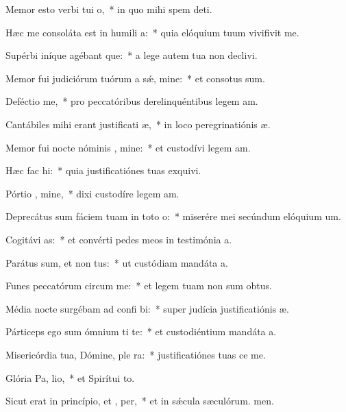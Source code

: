\item Memor esto verbi tui  o,~* in quo mihi spem deti.
\item Hæc me consoláta est in humili a:~* quia elóquium tuum vivifivit me.
\item Supérbi iníque agébant que:~* a lege autem tua non declivi.
\item Memor fui judiciórum tuórum a sǽ, mine:~* et consotus sum.
\item Deféctio  me,~* pro peccatóribus derelinquéntibus legem am.
\item Cantábiles mihi erant justificati æ,~* in loco peregrinatiónis æ.
\item Memor fui nocte nóminis , mine:~* et custodívi legem am.
\item Hæc fac  hi:~* quia justificatiónes tuas exquivi.
\item Pórtio , mine,~* dixi custodíre legem am.
\item Deprecátus sum fáciem tuam in toto  o:~* miserére mei secúndum elóquium um.
\item Cogitávi  as:~* et convérti pedes meos in testimónia a.
\item Parátus sum, et non  tus:~* ut custódiam mandáta a.
\item Funes peccatórum circum  me:~* et legem tuam non sum obtus.
\item Média nocte surgébam ad confi bi:~* super judícia justificatiónis æ.
\item Párticeps ego sum ómnium ti te:~* et custodiéntium mandáta a.
\item Misericórdia tua, Dómine, ple  ra:~* justificatiónes tuas ce me.
\item Glória Pa,  lio,~* et Spirítui to.
\item Sicut erat in princípio, et ,  per,~* et in sǽcula sæculórum. men.
